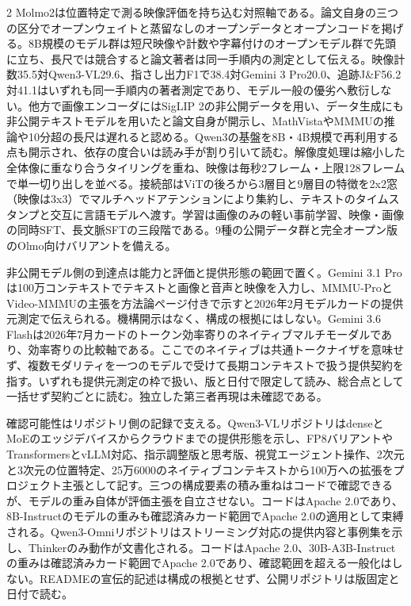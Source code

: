 \documentclass[lualatex,a4paper,10pt]{jlreq}
\begin{document}
\begin{multicols}{2}
\noindent Molmo2は位置特定で測る映像評価を持ち込む対照軸である。論文自身の三つの区分でオープンウェイトと蒸留なしのオープンデータとオープンコードを掲げる。8B規模のモデル群は短尺映像や計数や字幕付けのオープンモデル群で先頭に立ち、長尺では競合すると論文著者は同一手順内の測定として伝える。映像計数35.5対Qwen3-VL29.6、指さし出力F1で38.4対Gemini 3 Pro20.0、追跡J\&F56.2対41.1はいずれも同一手順内の著者測定であり、モデル一般の優劣へ敷衍しない。他方で画像エンコーダにはSigLIP 2の非公開データを用い、データ生成にも非公開テキストモデルを用いたと論文自身が開示し、MathVistaやMMMUの推論や10分超の長尺は遅れると認める。Qwen3の基盤を8B・4B規模で再利用する点も開示され、依存の度合いは読み手が割り引いて読む。解像度処理は縮小した全体像に重なり合うタイリングを重ね、映像は毎秒2フレーム・上限128フレームで単一切り出しを並べる。接続部はViTの後ろから3層目と9層目の特徴を2x2窓（映像は3x3）でマルチヘッドアテンションにより集約し、テキストのタイムスタンプと交互に言語モデルへ渡す。学習は画像のみの軽い事前学習、映像・画像の同時SFT、長文脈SFTの三段階である。9種の公開データ群と完全オープン版のOlmo向けバリアントを備える。\autocite{vmd071}\par\medskip
\noindent 非公開モデル側の到達点は能力と評価と提供形態の範囲で置く。Gemini 3.1 Proは100万コンテキストでテキストと画像と音声と映像を入力し、MMMU-ProとVideo-MMMUの主張を方法論ページ付きで示すと2026年2月モデルカードの提供元測定で伝えられる。機構開示はなく、構成の根拠にはしない。Gemini 3.6 Flashは2026年7月カードのトークン効率寄りのネイティブマルチモーダルであり、効率寄りの比較軸である。ここでのネイティブは共通トークナイザを意味せず、複数モダリティを一つのモデルで受けて長期コンテキストで扱う提供契約を指す。いずれも提供元測定の枠で扱い、版と日付で限定して読み、総合点として一括せず契約ごとに読む。独立した第三者再現は未確認である。\autocite{vmd072,vmd073}\par\medskip
\noindent 確認可能性はリポジトリ側の記録で支える。Qwen3-VLリポジトリはdenseとMoEのエッジデバイスからクラウドまでの提供形態を示し、FP8バリアントやTransformersとvLLM対応、指示調整版と思考版、視覚エージェント操作、2次元と3次元の位置特定、25万6000のネイティブコンテキストから100万への拡張をプロジェクト主張として記す。三つの構成要素の積み重ねはコードで確認できるが、モデルの重み自体が評価主張を自立させない。コードはApache 2.0であり、8B-Instructのモデルの重みも確認済みカード範囲でApache 2.0の適用として束縛される。Qwen3-Omniリポジトリはストリーミング対応の提供内容と事例集を示し、Thinkerのみ動作が文書化される。コードはApache 2.0、30B-A3B-Instructの重みは確認済みカード範囲でApache 2.0であり、確認範囲を超える一般化はしない。READMEの宣伝的記述は構成の根拠とせず、公開リポジトリは版固定と日付で読む。\autocite{vmd074,vmd075}\par\medskip

\end{multicols}
\end{document}
